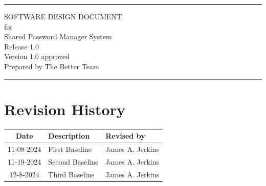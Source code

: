 \documentclass[letterpaper,12pt,oneside,listof=totoc]{scrreprt}
\date{\today}
\author{} %
\def\myversion{1.0 }
\begin{document}
\begin{titlepage}
\flushright
\rule{\textwidth}{5pt}\vskip1cm
\Huge{SOFTWARE DESIGN DOCUMENT}\\
\vspace{1.5cm}
for\\
\vspace{1.5cm}
Shared Password Manager System\\                      %
\vspace{1.5cm}
\LARGE{Release 1.0\\}
\vspace{1.5cm}
\LARGE{Version \myversion approved\\}
\vspace{1.5cm}
Prepared by The Better Team\\
\vfill
\rule{\textwidth}{5pt}
\end{titlepage}
\tableofcontents
\listoffigures
\listoftables

\chapter*{Revision History}

\begin{tabular}{| c | p{} | p{} |}
\hline
Date     & Description   & Revised by \\
\hline
11-08-2024 & First Baseline & James A. Jerkins \\
11-19-2024 & Second Baseline & James A. Jerkins \\
12-8-2024 & Third Baseline & James A. Jerkins \\
\hline
\end{tabular}

%
%
%
\end{document}
